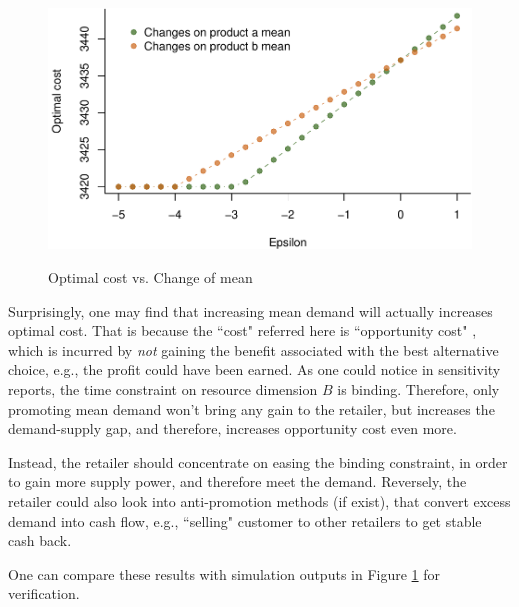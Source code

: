 \documentclass[a4paper,11pt]{article}
\begin{document}
\begin{figure}[htb]
\centering
\caption{Optimal cost vs. Change of mean}
\includegraphics{Example-figure_files/figure-latex/mean-1.pdf}
\label{fig:mean}
\end{figure}

Surprisingly, one may find that increasing mean demand will actually increases optimal cost. That is because the ``cost" referred here is ``opportunity cost" \cite{Ch12,Po02}, which is incurred by \emph{not} gaining the benefit associated with the best alternative choice, e.g., the profit could have been earned. As one could notice in sensitivity reports, the time constraint on resource dimension $B$ is binding. Therefore, only promoting mean demand won't bring any gain to the retailer, but increases the demand-supply gap, and therefore, increases opportunity cost even more.

Instead, the retailer should concentrate on easing the binding constraint, in order to gain more supply power, and therefore meet the demand. Reversely, the retailer could also look into anti-promotion methods (if exist), that convert excess demand into cash flow, e.g., ``selling" customer to other retailers to get stable cash back.

One can compare these results with simulation outputs in Figure \ref{fig:mean} for verification.
\end{document}
